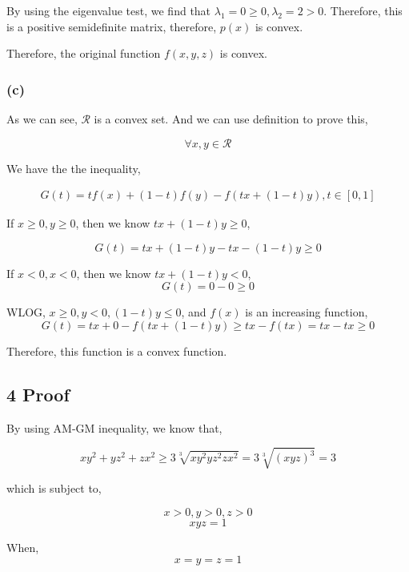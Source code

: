 \documentclass{article}
\begin{document}
By using the eigenvalue test, we find that $\lambda_1 = 0 \ge 0, \lambda_2 = 2 > 0$. Therefore, this is a positive semidefinite matrix, therefore, $p(x)$ is convex.

Therefore, the original function $f(x, y , z)$ is convex.

\subsubsection*{(c)}
As we can see, $\mathcal{R}$ is a convex set. And we can use definition to prove this,

$$\forall x , y \in \mathcal{R}$$

We have the the inequality,

\[
\begin{split}
G(t) = tf(x) + (1 - t)f(y) - f(tx + (1-t)y), t \in [0, 1] 
\end{split}
\]

If $x \ge 0, y \ge 0$, then we know $tx + (1-t)y \ge 0$, 

$$G(t) = tx + (1 - t)y - tx - (1 - t)y \ge 0$$

If $x < 0, x < 0$, then we know $tx + (1 - t)y < 0$, 
$$G(t) = 0 - 0 \ge 0$$

WLOG, $x \ge 0, y < 0, (1-t)y \le 0$, and $f(x)$ is an increasing function,
$$G(t) = tx + 0 - f(tx + (1-t)y)\ge tx - f(tx) = tx - tx \ge 0$$

Therefore, this function is a convex function.

\subsection*{4 Proof}
By using AM-GM inequality, we know that,

$$xy^2 + yz^2 + zx^2 \ge 3 \sqrt[3]{xy^2yz^2zx^2} = 3 \sqrt[3]{(xyz)^3} = 3$$

which is subject to,

$$x > 0, y > 0, z > 0$$
$$xyz = 1$$

When, $$x = y = z = 1$$
\end{document}
